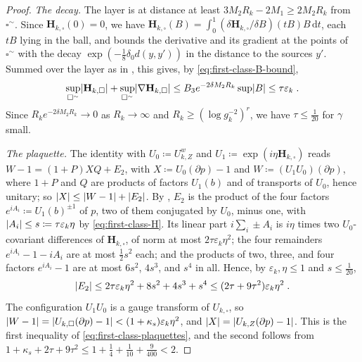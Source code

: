 \documentclass[11pt]{preprint}
\newcommand{\dd}{\mathrm{d}}
\DeclarePairedDelimiter{\abs}{\lvert}{\rvert}
\numberwithin{equation}{section}
\theoremstyle{definition}
\theoremstyle{remark}
\theoremstyle{plain}
\begin{document}
\begin{proof}
\emph{The decay.} The layer is at distance at least $3M_2R_k - 2M_1 \geq 2M_2R_k$ from $\square^\sim$. Since $\mathbf H_{k,\square}(0) = 0$, we have $\mathbf H_{k,\square}(B) = \int_0^1(\delta\mathbf H_{k,\square}/\delta B)(tB)B\,\dd t$, each $tB$ lying in the ball, and \cite[(190), p.~308]{BalabanVAR} bounds the derivative and its gradient at the points of $\square^\sim$ with the decay $\exp(-\frac18\delta_0d(y, y'))$ in the distance to the sources $y'$. Summed over the layer as in \cite[(3.7), p.~266]{BalabanCRE}, this gives, by \eqref{eq:first-class-B-bound},
\begin{equation}\label{eq:first-class-H}
    \sup_{\square^\sim}\abs{\mathbf H_{k,\square}} + \sup_{\square^\sim}\abs{\nabla\mathbf H_{k,\square}} \leq B_3e^{-2\delta M_2R_k}\sup\abs B \leq \tau\varepsilon_k\;.
\end{equation}
Since $R_ke^{-2\delta M_2R_k} \to 0$ as $R_k \to \infty$ and $R_k \geq (\log g_k^{-2})^r$, we have $\tau \leq \frac1{20}$ for $\gamma$ small.

\emph{The plaquette.} The identity \cite[(1.43)]{BalabanREG} with $U_0 \coloneqq U^w_{k,Z}$ and $U_1 \coloneqq \exp(i\eta\mathbf H_{k,\square})$ reads $W - 1 = (1 + P)XQ + E_2$, with $X \coloneqq U_0(\partial p) - 1$ and $W \coloneqq (U_1U_0)(\partial p)$, where $1 + P$ and $Q$ are products of factors $U_1(b)$ and of transports of $U_0$, hence unitary; so $\abs X \leq \abs{W - 1} + \abs{E_2}$. By \cite[(1.22), p.~79]{BalabanREG}, $E_2$ is the product of the four factors $e^{iA_i} \coloneqq U_1(b)^{\pm1}$ of $p$, two of them conjugated by $U_0$, minus one, with $\abs{A_i} \leq s \coloneqq \tau\varepsilon_k\eta$ by \eqref{eq:first-class-H}. Its linear part $i\sum_i\pm A_i$ is $i\eta$ times two $U_0$-covariant differences of $\mathbf H_{k,\square}$, of norm at most $2\tau\varepsilon_k\eta^2$; the four remainders $e^{iA_i} - 1 - iA_i$ are at most $\frac12s^2$ each; and the products of two, three, and four factors $e^{iA_i} - 1$ are at most $6s^2$, $4s^3$, and $s^4$ in all. Hence, by $\varepsilon_k, \eta \leq 1$ and $s \leq \frac1{20}$,
\begin{equation}\label{eq:first-class-E2}
    \abs{E_2} \leq 2\tau\varepsilon_k\eta^2 + 8s^2 + 4s^3 + s^4 \leq (2\tau + 9\tau^2)\varepsilon_k\eta^2\;.
\end{equation}
The configuration $U_1U_0$ is a gauge transform of $U_{k,\square}$, so $\abs{W - 1} = \abs{U_{k,\square}(\partial p) - 1} < (1 + \kappa_s)\varepsilon_k\eta^2$, and $\abs X = \abs{U_{k,Z}(\partial p) - 1}$. This is the first inequality of \eqref{eq:first-class-plaquettes}, and the second follows from $1 + \kappa_s + 2\tau + 9\tau^2 \leq 1 + \frac14 + \frac1{10} + \frac9{400} < 2$.
\end{proof}
\end{document}
